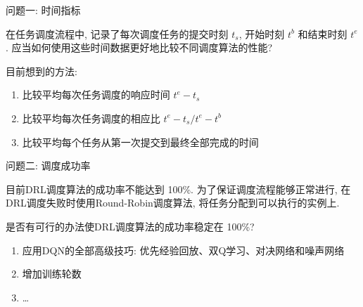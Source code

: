 \begin{frame}{问题一: 时间指标}

    在任务调度流程中, 记录了每次调度任务的提交时刻 $t_s$, 开始时刻 $t^b$ 和结束时刻 $t^e$.
    应当如何使用这些时间数据更好地比较不同调度算法的性能?

    目前想到的方法:
    \begin{enumerate}
        \item 比较平均每次任务调度的响应时间 $t^e - t_s$
        \item 比较平均每次任务调度的相应比 $t^e - t_s / t^e - t^b$
        \item 比较平均每个任务从第一次提交到最终全部完成的时间
    \end{enumerate}

\end{frame}

\begin{frame}{问题二: 调度成功率}

    目前DRL调度算法的成功率不能达到 100\%. 为了保证调度流程能够正常进行, 在DRL调度失败时使用Round-Robin调度算法, 将任务分配到可以执行的实例上.

    是否有可行的办法使DRL调度算法的成功率稳定在 100\%?

    \begin{enumerate}
        \item 应用DQN的全部高级技巧: 优先经验回放、双Q学习、对决网络和噪声网络
        \item 增加训练轮数
        \item \dots
    \end{enumerate}

\end{frame}
